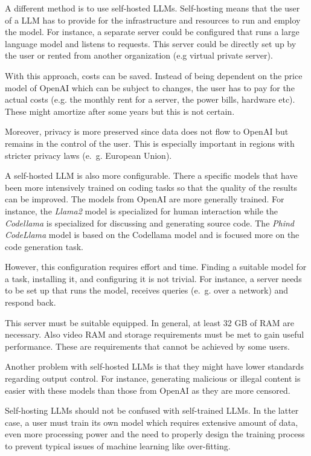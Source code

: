 A different method  is to use self-hosted \acp{LLM}.
Self-hosting means that the user of a \ac{LLM} has to provide for the infrastructure and resources to run and employ the model. For instance, a separate server could be configured that runs a large language model and listens to requests. This server could be directly set up by the user or rented from another organization (e.g virtual private server). 

With this approach, costs can be saved. Instead of being dependent on the price model of OpenAI which can be subject to changes, the user has to pay for the actual costs (e.g. the monthly rent for a server, the power bills, hardware etc). These might amortize after some years but this is not certain.

Moreover, privacy is more preserved since data does not flow to OpenAI but remains in the control of the user. This is especially important in regions with stricter privacy laws (e.~g. European Union).

A self-hosted \ac{LLM} is also more configurable. There a specific models that have been more intensively trained on coding tasks so that the quality of the results can be improved. The models from OpenAI are more generally trained.  For instance, the \textit{Llama2} model is specialized for human interaction while the \textit{Codellama} is specialized for discussing and generating source code. The \textit{Phind CodeLlama} model is based on the Codellama model and is focused more on the code generation task. 

However, this configuration requires effort and time. Finding a suitable model for a task, installing it, and configuring it is not trivial. For instance, a server needs to be set up that  runs the model, receives queries (e.~g. over a network) and respond back. 

This server must be suitable equipped. In general, at least 32 GB of RAM are necessary. Also video RAM and storage requirements must be met to gain useful performance. These are requirements that cannot be achieved by some users. 




Another problem with self-hosted \acp{LLM} is that they might have lower standards regarding output control. For instance, generating malicious or illegal content is easier with these models than those from OpenAI as they are more censored. 


Self-hosting \acfp{LLM} should not be confused with self-trained \acp{LLM}. In the latter case, a user must train its own model which requires extensive amount of data, even more processing power and the need to properly design the training process to prevent typical issues of machine learning like over-fitting.

